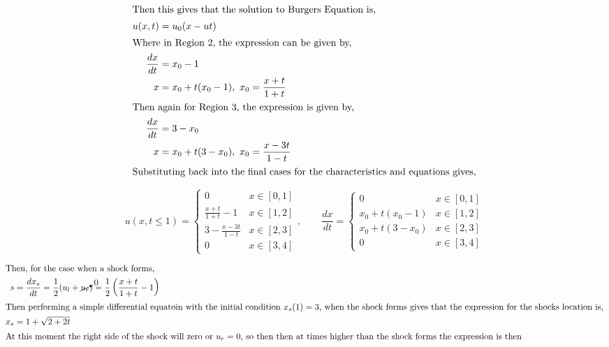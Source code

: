 \pagebreak
\pagestyle{fancy}
\restoregeometry
\begin{adjustwidth}{2.5em}{0pt}

    \begin{align*}
        \shortintertext{Then this gives that the solution to Burgers Equation is,}
        u(x,t) & = u_0(x - ut)\\ 
        \shortintertext{Where in Region 2, the expression can be given by,}
        \frac{dx}{dt} & = x_0 - 1\\ 
        x & = x_0 + t(x_0 - 1),\ x_0  = \frac{x+t}{1+t}\\
        \shortintertext{Then again for Region 3, the expression is given by,}
        \frac{dx}{dt} & = 3 - x_0\\ 
        x & = x_0 + t(3-x_0),\ x_0  = \frac{x-3t}{1-t}\\
        \shortintertext{Substituting back into the final cases for the characteristics and equations gives,}
    \end{align*}

    \vspace{-0.5in}
    \begin{equation*}
        \boxed{u(x,t \le 1) = \begin{cases}
            0 & x \in [0,1]\\
            \frac{x+t}{1+t} - 1 & x \in [1,2]\\ 
            3 - \frac{x-3t}{1-t} & x \in [2,3]\\ 
            0 & x \in [3, 4]
        \end{cases},\qquad \frac{dx}{dt} = \begin{cases}
            0 & x \in [0,1]\\
            x_0 + t(x_0 - 1) & x \in [1,2]\\ 
            x_0 + t(3-x_0) & x \in [2,3]\\ 
            0 & x \in [3, 4]
        \end{cases}}
    \end{equation*}

    \vspace{-0.25in}
    \begin{align*}
        \shortintertext{Then, for the case when a shock forms,}
        s & = \frac{dx_s}{dt} = \frac{1}{2}(u_l + \cancelto{0}{u_r}) = \frac{1}{2}\left(\frac{x+t}{1+t} - 1\right)\\ 
        \shortintertext{Then performing a simple differential equatoin with the initial condition $x_s(1)=3$, when the shock forms gives that the expression for the shocks location is,}
        x_s & = 1 + \sqrt{2 + 2t}\\ 
        \shortintertext{At this moment the right side of the shock will zero or $u_r=0$, so then then at times higher than the shock forms the expression is then}
    \end{align*}


\end{adjustwidth}
